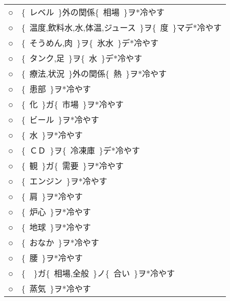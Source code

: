 \documentclass[fleqn]{nlp}
\newcommand{\sm}[1]{}
\begin{document}
\begin{table}
\begin{tabular}{lp{13cm}}
 ○ & \{~レベル~\}外の関係\hspace{0.8em}\{~相場~\}ヲ*\hspace{0.8em}冷やす \\
 ○ & \{~温度,飲料水,水,体温,ジュース~\}ヲ\hspace{0.8em}\{~\sm{数量}度~\}マデ*\hspace{0.8em}冷やす \\
 ○ & \{~そうめん,肉~\}ヲ\hspace{0.8em}\{~氷水~\}デ*\hspace{0.8em}冷やす \\
 ○ & \{~タンク,足~\}ヲ\hspace{0.8em}\{~水~\}デ*\hspace{0.8em}冷やす \\
 ○ & \{~療法,状況~\}外の関係\hspace{0.8em}\{~熱~\}ヲ*\hspace{0.8em}冷やす \\
 ○ & \{~患部~\}ヲ*\hspace{0.8em}冷やす \\
 ○ & \{~化~\}ガ\hspace{0.8em}\{~市場~\}ヲ*\hspace{0.8em}冷やす \\
 ○ & \{~ビール~\}ヲ*\hspace{0.8em}冷やす \\
 ○ & \{~水~\}ヲ*\hspace{0.8em}冷やす \\
 ○ & \{~ＣＤ~\}ヲ\hspace{0.8em}\{~冷凍庫~\}デ*\hspace{0.8em}冷やす \\
 ○ & \{~観~\}ガ\hspace{0.8em}\{~需要~\}ヲ*\hspace{0.8em}冷やす \\
 ○ & \{~エンジン~\}ヲ*\hspace{0.8em}冷やす \\
 ○ & \{~肩~\}ヲ*\hspace{0.8em}冷やす \\
 ○ & \{~炉心~\}ヲ*\hspace{0.8em}冷やす \\
 ○ & \{~地球~\}ヲ*\hspace{0.8em}冷やす \\
 ○ & \{~おなか~\}ヲ*\hspace{0.8em}冷やす \\
 ○ & \{~腰~\}ヲ*\hspace{0.8em}冷やす \\
 ○ & \{~\sm{補文}~\}ガ\hspace{0.8em}\{~相場,全般~\}ノ\hspace{0.8em}\{~合い~\}ヲ*\hspace{0.8em}冷やす \\
 ○ & \{~蒸気~\}ヲ*\hspace{0.8em}冷やす \\ \hline
 \end{tabular}
\end{table}
\end{document}
